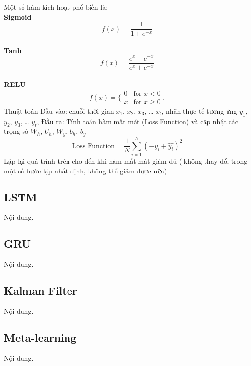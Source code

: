 Một số hàm kích hoạt phổ biến là:
\\ \textbf{Sigmoid}
\[f(x)=\frac{1}{1+e^{-x}}\]
\\ \textbf{Tanh}
\[f(x) = \frac{e^x - e^{-x}}{e^x + e^{-x}}\]
\\ \textbf{RELU}
\[f(x)=\{\begin{matrix}
0 & \text{for } x<0 \\
x & \text{for } x\ge0
\end{matrix}.\]
Thuật toán
Đầu vào: chuỗi thời gian \(x_1\), \(x_2\), \(x_3\), … \(x_t\), nhãn thực tế tương ứng \(y_1\), \(y_2\), \(y_3\), … \(y_t\),
Đầu ra: Tính toán hàm mất mát (Loss Function) và cập nhật các trọng số \(W_h\), \(U_h\), \(W_y\), \(b_h\), \(b_y\)
\[\text{Loss Function} = \frac{1}{N} \sum_{i=1}^{N} (-y_i + \hat{y_i})^2\]
Lặp lại quá trình trên cho đến khi hàm mất mát giảm đủ ( không thay đổi trong một số bước lặp nhất định, không thể giảm được nữa)
\subsection{LSTM}
Nội dung.

\subsection{GRU}
Nội dung.

\subsection{Kalman Filter}
Nội dung.

\subsection{Meta-learning}
Nội dung.

